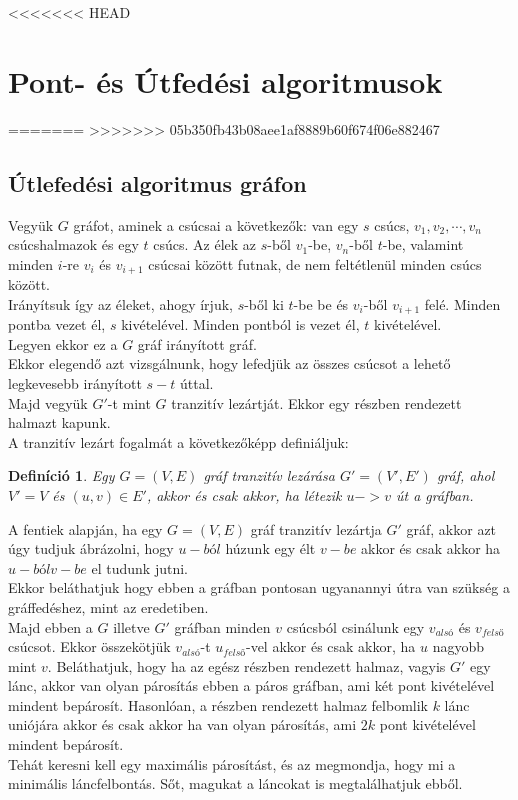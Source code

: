 \documentclass[12pt]{article}
\newtheorem{defin}{Definíció}[section]
\begin{document}
<<<<<<< HEAD
\pagebreak

\section{Pont- és Útfedési algoritmusok}



=======
>>>>>>> 05b350fb43b08aee1af8889b60f674f06e882467
\subsection{Útlefedési algoritmus gráfon}

Vegyük $G$ gráfot, aminek a csúcsai a következők:
van egy $s$ csúcs, $v_1, v_2, \cdots, v_n$ csúcshalmazok és egy $t$ csúcs.
Az élek az $s$-ből $v_1$-be, $v_n$-ből $t$-be, valamint minden $i$-re $v_i$ és $v_{i+1}$ csúcsai között futnak, de nem feltétlenül minden csúcs között.\\
Irányítsuk így az éleket, ahogy írjuk, $s$-ből ki $t$-be be és $v_i$-ből $v_{i+1}$ felé. Minden pontba vezet él, $s$ kivételével. Minden pontból is vezet él, $t$ kivételével.\\
Legyen ekkor ez a $G$ gráf irányított gráf.\\
Ekkor elegendő azt vizsgálnunk, hogy lefedjük az összes csúcsot a lehető legkevesebb irányított $s-t$ úttal.\\
Majd vegyük $G'$-t mint $G$ tranzitív lezártját. Ekkor egy részben rendezett halmazt kapunk.\\

A tranzitív lezárt fogalmát a következőképp definiáljuk:

\begin{defin}
Egy $G = (V,E)$ gráf tranzitív lezárása $G' = (V',E')$ gráf, ahol $V' = V$ és $(u,v) \in E'$, akkor és csak akkor, ha létezik $u -> v$ út a gráfban.
\end{defin}

A fentiek alapján, ha egy $G = (V,E)$ gráf tranzitív lezártja $G'$ gráf, akkor azt úgy tudjuk ábrázolni, hogy $u-ból$ húzunk egy élt $v-be$ akkor és csak akkor ha $u-ból v-be$ el tudunk jutni.\\

Ekkor beláthatjuk hogy ebben a gráfban pontosan ugyanannyi útra van szükség a gráffedéshez, mint az eredetiben.\\
Majd ebben a $G$ illetve $G'$ gráfban minden $v$ csúcsból csinálunk egy $v_{alsó}$ és $v_{felső}$ csúcsot.
Ekkor összekötjük $v_{alsó}$-t $u_{felső}$-vel akkor és csak akkor, ha $u$ nagyobb mint $v$. Beláthatjuk, hogy ha az egész részben rendezett halmaz, vagyis $G'$ egy lánc, akkor van olyan párosítás ebben a páros gráfban, ami két pont kivételével mindent bepárosít.
Hasonlóan, a részben rendezett halmaz felbomlik $k$ lánc uniójára akkor és csak akkor ha van olyan párosítás, ami $2k$ pont kivételével mindent bepárosít.\\
Tehát keresni kell egy maximális párosítást, és az megmondja, hogy mi a minimális láncfelbontás. Sőt, magukat a láncokat is megtalálhatjuk ebből.
\end{document}
